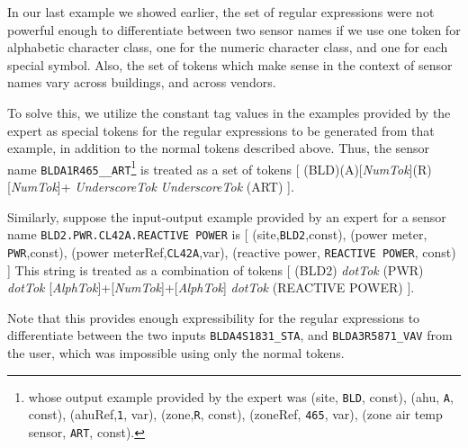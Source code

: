 In our last example we showed earlier, the set of regular expressions were not powerful enough to differentiate between two sensor names if we use one token for alphabetic character class, one for the numeric character class, and one for each special symbol. Also, the set of tokens which make sense in the context of sensor names vary across buildings, and across vendors.

%

To solve this, we utilize the constant tag values in the examples provided by the expert as special tokens for the regular expressions to be generated from that example, in addition to the normal tokens described above. Thus, the sensor name \texttt{BLDA1R465\_\_ART}\footnote{whose output example provided by the expert was (site, \texttt{BLD}, const), (ahu, \texttt{A}, const), (ahuRef,\texttt{1}, var), (zone,\texttt{R}, const), (zoneRef, \texttt{465}, var), (zone air temp sensor, \texttt{ART}, const). } is treated as a set of tokens [ (BLD)(A)[{\it NumTok}](R)[{\it NumTok}]+ {\it UnderscoreTok} {\it UnderscoreTok} (ART) ].


Similarly, suppose the input-output example provided by an expert for a sensor name \texttt{BLD2.PWR.CL42A.REACTIVE POWER} is [ (site,\texttt{BLD2},const), (power meter, \texttt{PWR},const), (power meterRef,\texttt{CL42A},var), (reactive power, \texttt{REACTIVE POWER}, const) ]   
This string is treated as a combination of tokens [ (BLD2) {\it dotTok} (PWR) {\it dotTok} [{\it AlphTok}]+[{\it NumTok}]+[{\it AlphTok}] {\it dotTok} (REACTIVE POWER) ]. 

Note that this provides enough expressibility for the regular expressions to differentiate between the two inputs \texttt{BLDA4S1831\_STA}, and  \texttt{BLDA3R5871\_VAV} from the user, which was impossible using only the normal tokens. \\


